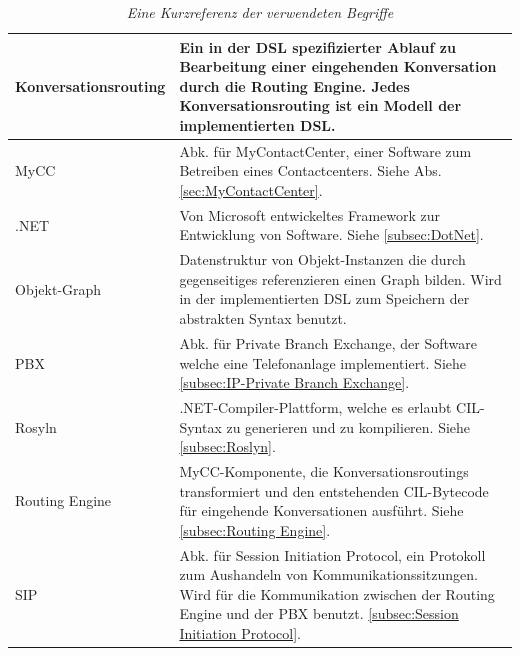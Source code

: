 \begin{table}[hbtp]
\begin{tabulary}{1.0\textwidth}{L|L}
\hline

Konversationsrouting & Ein in der DSL spezifizierter Ablauf zu Bearbeitung einer eingehenden Konversation durch die Routing Engine. Jedes Konversationsrouting ist ein Modell der implementierten DSL.\\

\hline

MyCC & Abk. für MyContactCenter, einer Software zum Betreiben eines Contactcenters. Siehe Abs. \ref{sec:MyContactCenter}.\\

\hline

.NET & Von Microsoft entwickeltes Framework zur Entwicklung von Software. Siehe \ref{subsec:DotNet}.\\

\hline

Objekt-Graph & Datenstruktur von Objekt-Instanzen die durch gegenseitiges referenzieren einen Graph bilden. Wird in der implementierten DSL zum Speichern der abstrakten Syntax benutzt.\\

\hline

PBX & Abk. für Private Branch Exchange, der Software welche eine Telefonanlage implementiert. Siehe \ref{subsec:IP-Private Branch Exchange}.\\

\hline

Rosyln & .NET-Compiler-Plattform, welche es erlaubt CIL-Syntax zu generieren und zu kompilieren. Siehe \ref{subsec:Roslyn}.\\

\hline

Routing Engine & MyCC-Komponente, die Konversationsroutings transformiert und den entstehenden CIL-Bytecode für eingehende Konversationen ausführt. Siehe \ref{subsec:Routing Engine}.\\

\hline
SIP & Abk. für Session Initiation Protocol, ein Protokoll zum Aushandeln von Kommunikationssitzungen. Wird für die Kommunikation zwischen der Routing Engine und der PBX benutzt. \ref{subsec:Session Initiation Protocol}.  \\

\end{tabulary}
\caption{\textit{Eine Kurzreferenz der verwendeten Begriffe}}
\label{tab:kurzreferenz}
\end{table}


